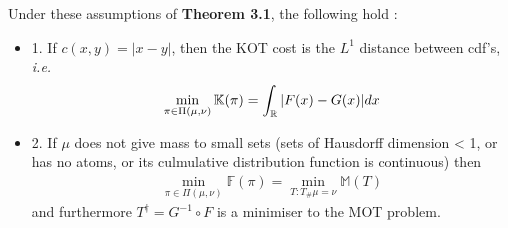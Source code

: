 \documentclass[12pt,a4paper]{article}
\renewenvironment{i}
{\begin{itemize} 
	}%
	{\end{itemize}
}
\begin{document}
 Under these assumptions of \textbf{Theorem 3.1}, the following hold :
\begin{i}
\item[1.] If $c(x,y) = |x-y|$, then the KOT cost is the $L^1$ distance between cdf's, \textit{i.e.}
\begin{align*}
\min_{\pi \in \Pi(\mu,\nu)}\mathbb{K}(\pi) = \int_{\mathbb{R}} |F(x) - G(x)| dx
\end{align*}
\item[2.] If $\mu$ does not give mass to small sets (sets of Hausdorff dimension < 1, or has no atoms, or its culmulative distribution function is continuous) then
\begin{align*}
\min_{\pi \in \Pi(\mu, \nu)} \mathbb{F}(\pi) = \min_{T: T_{\#}\mu =\nu} \mathbb{M}(T)
\end{align*}
and furthermore $T^{\dagger} = G^{-1} \circ F$ is a minimiser to the MOT problem.
\end{i}
\end{document}
